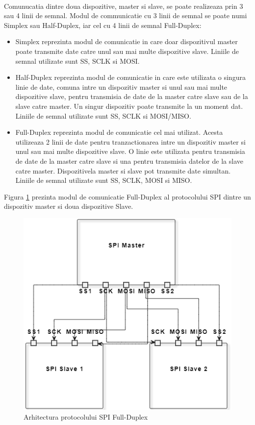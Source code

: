 \

Comunucatia dintre doua dispozitive, master si slave, se poate realizeaza prin 3 sau 4 linii de semnal. Modul de communicatie cu 3 linii de semnal se poate 
numi Simplex sau Half-Duplex, iar cel cu 4 linii de semnal Full-Duplex:
\begin{itemize}
    \item Simplex reprezinta modul de comunicatie in care doar dispozitivul master poate transmite date catre unul sau mai multe dispozitive slave. Liniile 
    de semnal utilizate sunt SS, SCLK si MOSI.
    \item Half-Duplex reprezinta modul de comunicatie in care este utilizata o singura linie de date, comuna intre un dispozitiv master si unul sau mai multe 
    dispozitive slave, pentru transmisia de date de la master catre slave sau de la slave catre master. Un singur dispozitiv poate transmite la un moment dat. 
    Liniile de semnal utilizate sunt SS, SCLK si MOSI/MISO.
    \item Full-Duplex reprezinta modul de comunicatie cel mai utilizat. Acesta utilizeaza 2 linii de date pentru tranzactionarea intre un dispozitiv master 
    si unul sau mai multe dispozitive slave. O linie este utilizata pentru transmisia de date de la master catre slave si una pentru transmisia datelor de 
    la slave catre master. Dispozitivela master si slave pot transmite date simultan. Liniile de semnal utilizate sunt SS, SCLK, MOSI si MISO.    
\end{itemize}

Figura \ref{fig:SPIMasterSlave} prezinta modul de comunicatie Full-Duplex al protocolului SPI dintre un dispozitiv master si doua dispozitive Slave.
\begin{figure}[H]
    \centering
    \includegraphics[scale=0.8]{figs/SPIMasterSlave.png}
    \caption{Arhitectura protocolului SPI Full-Duplex}
    \label{fig:SPIMasterSlave}
\end{figure}

